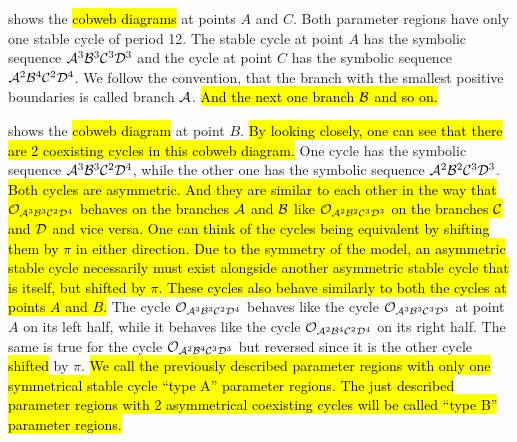  shows the \hl{cobweb diagrams} at points $A$ and $C$.
Both parameter regions have only one stable cycle of period 12.
The stable cycle at point $A$ has the symbolic sequence $\mathcal{A}^3\mathcal{B}^3\mathcal{C}^3\mathcal{D}^3$ and the cycle at point $C$ has the symbolic sequence $\mathcal{A}^2\mathcal{B}^4\mathcal{C}^2\mathcal{D}^4$.
We follow the convention, that the branch with the smallest positive boundaries is called branch $\mathcal{A}$.
\hl{And the next one branch $\mathcal{B}$ and so on.}

 shows the \hl{cobweb diagram} at point $B$.
\hl{By looking closely, one can see that there are 2 coexisting cycles in this cobweb diagram.}
One cycle has the symbolic sequence $\mathcal{A}^3\mathcal{B}^3\mathcal{C}^2\mathcal{D}^4$, while the other one has the symbolic sequence $\mathcal{A}^2\mathcal{B}^2\mathcal{C}^3\mathcal{D}^3$.
\hl{
	Both cycles are asymmetric.
	And they are similar to each other in the way that $\mathcal{O}_{\mathcal{A}^3\mathcal{B}^3\mathcal{C}^2\mathcal{D}^4}$ behaves on the branches $\mathcal{A}$ and $\mathcal{B}$ like $\mathcal{O}_{\mathcal{A}^2\mathcal{B}^2\mathcal{C}^3\mathcal{D}^3}$ on the branches $\mathcal{C}$ and $\mathcal{D}$ and vice versa.
	One can think of the cycles being equivalent by shifting them by $\pi$ in either direction.
	Due to the symmetry of the model, an asymmetric stable cycle necessarily must exist alongside another asymmetric stable cycle that is itself, but shifted by $\pi$.
	These cycles also behave similarly to both the cycles at points $A$ and $B$.
}
The cycle $\mathcal{O}_{\mathcal{A}^3\mathcal{B}^3\mathcal{C}^2\mathcal{D}^4}$ behaves like the cycle $\mathcal{O}_{\mathcal{A}^3\mathcal{B}^3\mathcal{C}^3\mathcal{D}^3}$ at point $A$ on its left half, while it behaves like the cycle $\mathcal{O}_{\mathcal{A}^2\mathcal{B}^4\mathcal{C}^2\mathcal{D}^4}$ on its right half.
The same is true for the cycle $\mathcal{O}_{\mathcal{A}^2\mathcal{B}^4\mathcal{C}^3\mathcal{D}^3}$ but reversed since it is the other cycle \hl{shifted} by $\pi$.
\hl{
	We call the previously described parameter regions with only one symmetrical stable cycle ``type A'' parameter regions.
	The just described parameter regions with 2 asymmetrical coexisting cycles will be called ``type B'' parameter regions.
}


